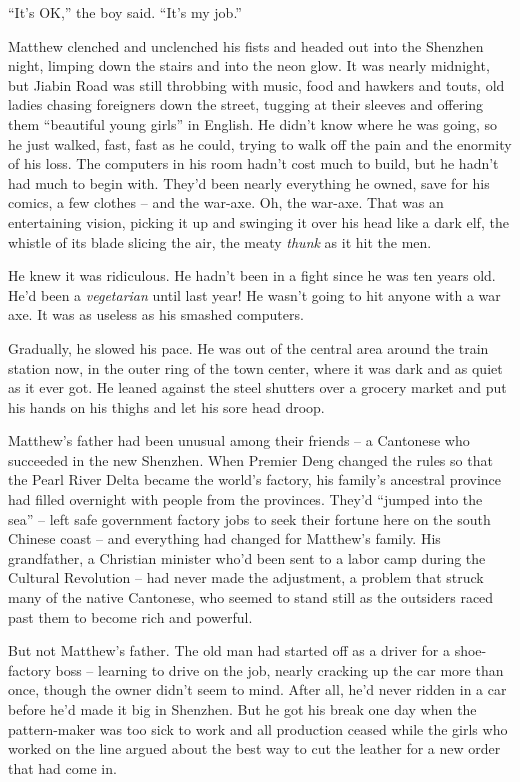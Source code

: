 ``It's OK,'' the boy said. ``It's my job.''

Matthew clenched and unclenched his fists and headed out into the
Shenzhen night, limping down the stairs and into the neon glow. It
was nearly midnight, but Jiabin Road was still throbbing with
music, food and hawkers and touts, old ladies chasing foreigners
down the street, tugging at their sleeves and offering them
``beautiful young girls'' in English. He didn't know where he was
going, so he just walked, fast, fast as he could, trying to walk
off the pain and the enormity of his loss. The computers in his
room hadn't cost much to build, but he hadn't had much to begin
with. They'd been nearly everything he owned, save for his comics,
a few clothes -- and the war-axe. Oh, the war-axe. That was an
entertaining vision, picking it up and swinging it over his head
like a dark elf, the whistle of its blade slicing the air, the
meaty \emph{thunk} as it hit the men.

He knew it was ridiculous. He hadn't been in a fight since he was
ten years old. He'd been a \emph{vegetarian} until last year! He
wasn't going to hit anyone with a war axe. It was as useless as his
smashed computers.

Gradually, he slowed his pace. He was out of the central area
around the train station now, in the outer ring of the town center,
where it was dark and as quiet as it ever got. He leaned against
the steel shutters over a grocery market and put his hands on his
thighs and let his sore head droop.

Matthew's father had been unusual among their friends -- a
Cantonese who succeeded in the new Shenzhen. When Premier Deng
changed the rules so that the Pearl River Delta became the world's
factory, his family's ancestral province had filled overnight with
people from the provinces. They'd ``jumped into the sea'' -- left
safe government factory jobs to seek their fortune here on the
south Chinese coast -- and everything had changed for Matthew's
family. His grandfather, a Christian minister who'd been sent to a
labor camp during the Cultural Revolution -- had never made the
adjustment, a problem that struck many of the native Cantonese, who
seemed to stand still as the outsiders raced past them to become
rich and powerful.

But not Matthew's father. The old man had started off as a driver
for a shoe-factory boss -- learning to drive on the job, nearly
cracking up the car more than once, though the owner didn't seem to
mind. After all, he'd never ridden in a car before he'd made it big
in Shenzhen. But he got his break one day when the pattern-maker
was too sick to work and all production ceased while the girls who
worked on the line argued about the best way to cut the leather for
a new order that had come in.


